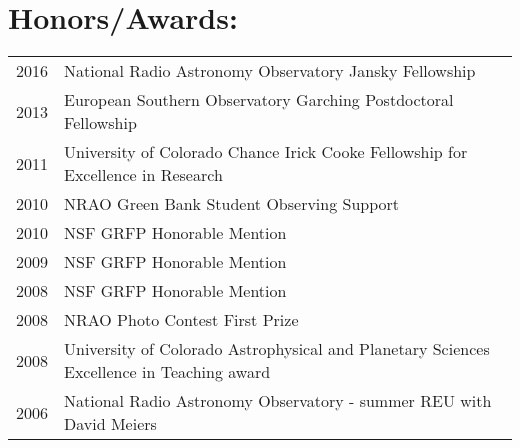 \setlength{\extrarowheight}{0pt}
\section*{Honors/Awards: }
\begin{tabular}{ll}
     2016 & National Radio Astronomy Observatory Jansky Fellowship \\
     2013 & European Southern Observatory Garching Postdoctoral Fellowship \\
     2011 & University of Colorado Chance Irick Cooke Fellowship for Excellence in Research \\
     2010 & NRAO Green Bank Student Observing Support  \\
     2010 & NSF GRFP Honorable Mention  \\
     2009 & NSF GRFP Honorable Mention  \\
     2008 & NSF GRFP Honorable Mention  \\
     2008 & NRAO Photo Contest First Prize \\
     2008 & University of Colorado Astrophysical and Planetary Sciences Excellence in Teaching award  \\
     2006 & National Radio Astronomy Observatory - summer REU with David Meiers  \\
\end{tabular}

